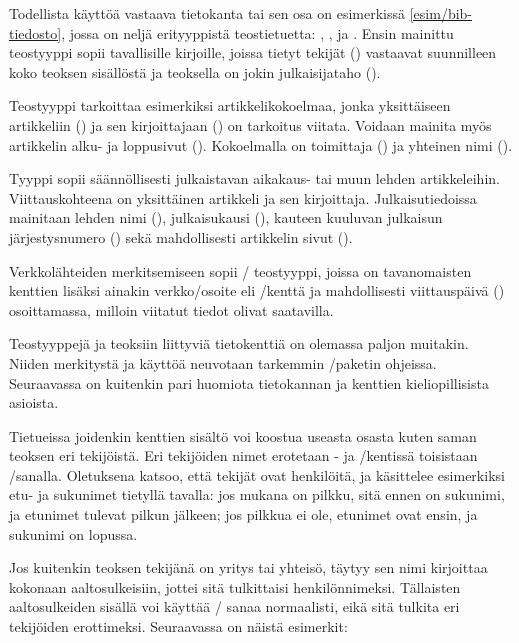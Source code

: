 Todellista käyttöä vastaava tietokanta tai sen osa on esimerkissä
\ref{esim/bib-tiedosto}, jossa on neljä erityyppistä teostietuetta:
, ,  ja .
Ensin mainittu teostyyppi  sopii tavallisille kirjoille,
joissa tietyt tekijät () vastaavat suunnilleen koko
teoksen sisällöstä ja teoksella on jokin julkaisijataho
().

Teostyyppi  tarkoittaa esimerkiksi
artikkelikokoelmaa, jonka yksittäiseen artikkeliin () ja
sen kirjoittajaan () on tarkoitus viitata. Voidaan mainita
myös artikkelin alku- ja loppusivut (). Kokoelmalla on
toimittaja () ja yhteinen nimi ().

Tyyppi  sopii säännöllisesti julkaistavan aikakaus- tai
muun lehden artikkeleihin. Viittauskohteena on yksittäinen artikkeli ja
sen kirjoittaja. Julkaisutiedoissa mainitaan lehden nimi
(), julkaisukausi (), kauteen
kuuluvan julkaisun järjestysnumero () sekä mahdollisesti
artikkelin sivut ().

Verkkolähteiden merkitsemiseen sopii \-/ teostyyppi,
joissa on tavanomaisten kenttien lisäksi ainakin verkko\-/osoite eli
\-/kenttä ja mahdollisesti viittauspäivä ()
osoittamassa, milloin viitatut tiedot olivat saatavilla.

Teostyyppejä ja teoksiin liittyviä tietokenttiä on olemassa paljon
muitakin. Niiden merkitystä ja käyttöä neuvotaan tarkemmin
\-/paketin ohjeissa. Seuraavassa on kuitenkin pari
huomiota tietokannan ja kenttien kieliopillisista asioista.

Tietueissa joidenkin kenttien sisältö voi koostua useasta osasta kuten
saman teoksen eri tekijöistä. Eri tekijöiden nimet erotetaan
- ja \-/kentissä toisistaan
\-/sanalla. Oletuksena  katsoo, että
tekijät ovat henkilöitä, ja käsittelee esimerkiksi etu- ja sukunimet
tietyllä tavalla: jos mukana on pilkku, sitä ennen on sukunimi, ja
etunimet tulevat pilkun jälkeen; jos pilkkua ei ole, etunimet ovat
ensin, ja sukunimi on lopussa.

Jos kuitenkin teoksen tekijänä on yritys tai yhteisö, täytyy sen nimi
kirjoittaa kokonaan aaltosulkeisiin, jottei sitä tulkittaisi
henkilönnimeksi. Tällaisten aaltosulkeiden sisällä voi käyttää
\-/ sanaa normaalisti, eikä sitä tulkita eri tekijöiden
erottimeksi. Seuraavassa on näistä esimerkit:

